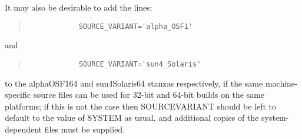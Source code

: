 \documentclass[twoside,11pt]{article}
\renewcommand{\_}{\texttt{\symbol{95}}}
\newenvironment{squote}{\begin{quote}\begin{small}}{\end{small}\end{quote}}
\begin{document}
It may also be desirable to add the lines:
\begin{squote}
\begin{verbatim}
            SOURCE_VARIANT='alpha_OSF1'
\end{verbatim}
\end{squote}
and
\begin{squote}
\begin{verbatim}
            SOURCE_VARIANT='sun4_Solaris'
\end{verbatim}
\end{squote}
to the alpha\_OSF1\_64 and sun4\_Solaris\_64 stanzas respectively,
if the same
machine-specific source files can be used for 32-bit and 64-bit
builds on the same platforms; if this is not the case then SOURCE\_VARIANT
should be left to default to the value of SYSTEM as usual,
and additional copies of the system-dependent files must be supplied.
\end{document}
